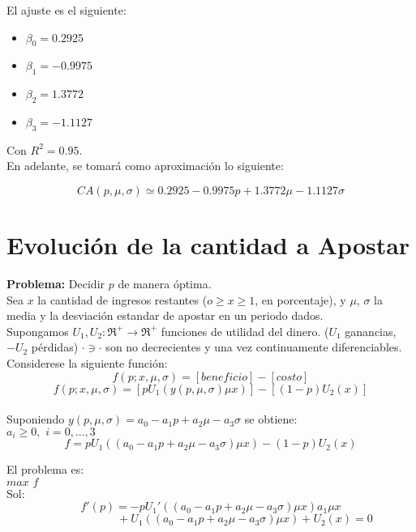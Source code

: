 El ajuste es el siguiente:

\begin{itemize}
 \item $\beta_0=0.2925$
  \item $\beta_1=-0.9975$
 \item $\beta_2=1.3772$
 \item $\beta_3=-1.1127$
\end{itemize}

Con $R^2=0.95$.\\

En adelante, se tomará como aproximación lo siguiente:

\[CA(p,\mu,\sigma)\simeq0.2925-0.9975p+1.3772\mu-1.1127\sigma\]

\section{Evolución de la cantidad a Apostar}

{\bf Problema:} Decidir $p$ de manera óptima.\\

Sea $x$ la cantidad de ingresos restantes ($o\ge x\ge1$, en porcentaje), y $\mu$, $\sigma$ la media y la desviación estandar de apostar en un periodo dados.\\

Supongamos $U_1,U_2: \Re^+\rightarrow \Re^+$ funciones de utilidad del dinero. ($U_1$ ganancias, $-U_2$ pérdidas) $\cdot\ni\cdot$ son no decrecientes y una vez continuamente diferenciables. Considerese la siguiente función:\\

\[f(p;x,\mu,\sigma)=[beneficio]-[costo]\]
\[f(p;x,\mu,\sigma)=[pU_1(y(p,\mu,\sigma)\mu x)]-[(1-p)U_2(x)]\]\\

Suponiendo $y(p,\mu,\sigma)=a_0-a_1p+a_2\mu-a_3\sigma$ se obtiene:\\

$a_i\ge 0,\,\,i=0,...,3$
\[f=pU_1((a_0-a_1p+a_2\mu-a_3\sigma)\mu x)-(1-p)U_2(x)\]

El problema es:\\

$max\,\,f$\\

Sol:\\

\[f'(p)=-pU_1'((a_0-a_1p+a_2\mu-a_3\sigma)\mu x)a_1\mu x\]
\[\qquad\qquad\qquad+U_1((a_0-a_1p+a_2\mu-a_3\sigma)\mu x)+U_2(x)=0\]

